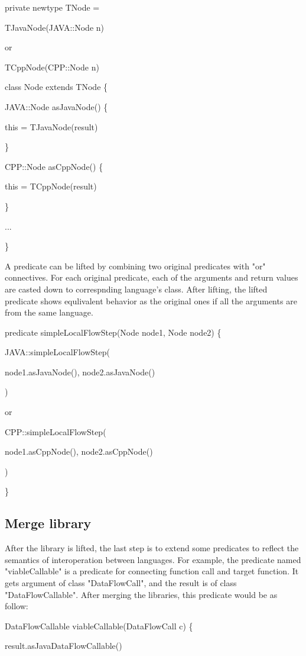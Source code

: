 private newtype TNode =

  TJavaNode(JAVA::Node n)
  
  or
  
  TCppNode(CPP::Node n)

class Node extends TNode \{
  
  JAVA::Node asJavaNode() \{
    
    this = TJavaNode(result)
  
  \}
  
  CPP::Node asCppNode() \{
    
    this = TCppNode(result)
  
  \}
  
  ...

\}

A predicate can be lifted by combining two original predicates with "or" connectives.
For each original predicate, each of the arguments and return values are casted down to
correspnding language's class. After lifting, the lifted predicate shows equlivalent behavior
as the original ones if all the arguments are from the same language.

predicate simpleLocalFlowStep(Node node1, Node node2) \{
  
  JAVA::simpleLocalFlowStep(
    
    node1.asJavaNode(), node2.asJavaNode()

  )
  
  or
  
  CPP::simpleLocalFlowStep(

    node1.asCppNode(), node2.asCppNode()

  )

\}

\subsection{Merge library}

After the library is lifted, the last step is to extend some predicates to reflect the
semantics of interoperation between languages. For example, the predicate named "viableCallable"
is a predicate for connecting function call and target function. It gets argument of class "DataFlowCall",
and the result is of class "DataFlowCallable". After merging the libraries, this predicate would be as follow:

DataFlowCallable viableCallable(DataFlowCall c) \{

result.asJavaDataFlowCallable()


